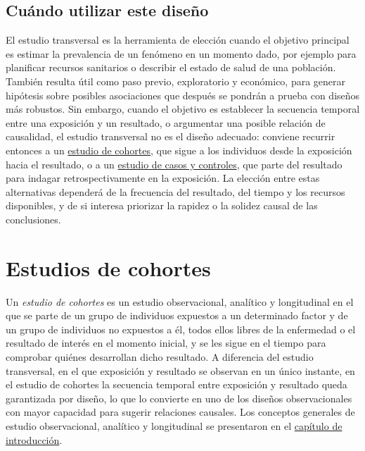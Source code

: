 \documentclass[
  spanish,
  a4paper,
]{scrreport}
\theoremstyle{definition}
\theoremstyle{definition}
\theoremstyle{remark}
\begin{document}
\section{Cuándo utilizar este
diseño}\label{cuuxe1ndo-utilizar-este-diseuxf1o-1}

El estudio transversal es la herramienta de elección cuando el objetivo
principal es estimar la prevalencia de un fenómeno en un momento dado,
por ejemplo para planificar recursos sanitarios o describir el estado de
salud de una población. También resulta útil como paso previo,
exploratorio y económico, para generar hipótesis sobre posibles
asociaciones que después se pondrán a prueba con diseños más robustos.
Sin embargo, cuando el objetivo es establecer la secuencia temporal
entre una exposición y un resultado, o argumentar una posible relación
de causalidad, el estudio transversal no es el diseño adecuado: conviene
recurrir entonces a un \href{04-estudios-cohortes.qmd}{estudio de
cohortes}, que sigue a los individuos desde la exposición hacia el
resultado, o a un \href{05-estudios-casos-controles.qmd}{estudio de
casos y controles}, que parte del resultado para indagar
retrospectivamente en la exposición. La elección entre estas
alternativas dependerá de la frecuencia del resultado, del tiempo y los
recursos disponibles, y de si interesa priorizar la rapidez o la solidez
causal de las conclusiones.

\chapter{Estudios de cohortes}\label{estudios-de-cohortes}

Un \emph{estudio de cohortes} es un estudio observacional, analítico y
longitudinal en el que se parte de un grupo de individuos expuestos a un
determinado factor y de un grupo de individuos no expuestos a él, todos
ellos libres de la enfermedad o el resultado de interés en el momento
inicial, y se les sigue en el tiempo para comprobar quiénes desarrollan
dicho resultado. A diferencia del estudio transversal, en el que
exposición y resultado se observan en un único instante, en el estudio
de cohortes la secuencia temporal entre exposición y resultado queda
garantizada por diseño, lo que lo convierte en uno de los diseños
observacionales con mayor capacidad para sugerir relaciones causales.
Los conceptos generales de estudio observacional, analítico y
longitudinal se presentaron en el
\hyperref[introducciuxf3n-a-los-tipos-de-estudios-estaduxedsticos]{capítulo
de introducción}.
\end{document}
